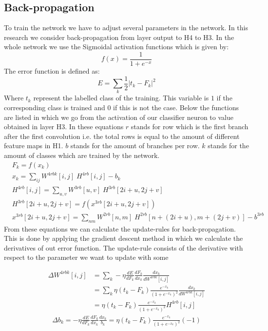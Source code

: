 \documentclass[a4paper,onecolumn]{report}
\begin{document}
\subsection{Back-propagation}
\label{sec:BP}
To train the network we have to adjust several parameters in the network. In this research we consider back-propagation from layer output to H4 to H3. In the whole network we use the Sigmoidal activation functions which is given by:
\begin{equation}
f(x)=\frac{1}{1+e^{-x}} 
\end{equation}	
The error function is defined as:
\begin{equation}
E=\sum_{k} \frac{1}{2}|t_k-F_{k}|^{2}
\end{equation}
Where $t_k$ represent the labelled class of the training. This variable is $1$ if the corresponding class is trained and $0$ if this is not the case. Below the functions are listed in which we go from the activation of our classifier neuron to value obtained in layer H3. In these equations $r$ stands for row which is the first branch after the first convolution i.e. the total rows is equal to the amount of different feature maps in H1. $b$ stands for the amount of branches per row. $k$ stands for the amount of classes which are trained by the network.
\begin{equation}
\begin{split}
	&F_{k}= f( x_{k}) \\
	& x_{k}=\sum_{ij} W^{4rbk}[i,j] \; H^{4rb}[i,j] - b_{k} \\
	&H^{4rb}[i,j]= \sum_{u,v} W^{3rb}[u,v] \; H^{3rb} [2i+u,2j+v] \\
	&H^{3rb} [2i+u,2j+v]= f\left (x^{3rb}[2i+u,2j+v] \right) \\
	&x^{3rb}[2i+u,2j+v]=\sum_{nm} W^{2rb}[n,m] \; H^{2rb}[n+(2i+u),m+(2j+v)] -b^{3rb}
\end{split}
\end{equation}
From these equations we can calculate the update-rules for back-propagation. This is done by applying the gradient descent method in which we calculate the derivatives of out error function. The update-rule consists of the derivative with respect to the parameter we want to update with some 

\begin{equation}
\begin{split}
\Delta W^{4rbk}[i,j]&= \sum_{k} - \eta \frac{dE}{d F_{k}} \frac{dF_{k}}{dx_{k}} \frac{dx_{k}}{dW^{4rbk}[i,j]} \\
&= \sum_{k} \eta (t_{k}-F_{k})\frac{e^{-x_{k}}}{(1+e^{-x_{k}})^{2}} \frac{dx_{k}}{dW^{4rbk}[i,j]} \\
&= \eta (t_{k}-F_{k})\frac{e^{-x_{k}}}{(1+e^{-x_{k}})^{2}} H^{4rb}[i,j]
\end{split}
\end{equation}
\begin{equation}
\begin{split}
\Delta b_{k}= - \eta \frac{dE}{d F_{k}} \frac{dF_{k}}{dx_{k}} \frac{dx_{k}}{b_{k}}=\eta (t_{k}-F_{k})\frac{e^{-x_{k}}}{(1+e^{-x_{k}})^{2}} (-1)
\end{split}
\end{equation}
\end{document}

